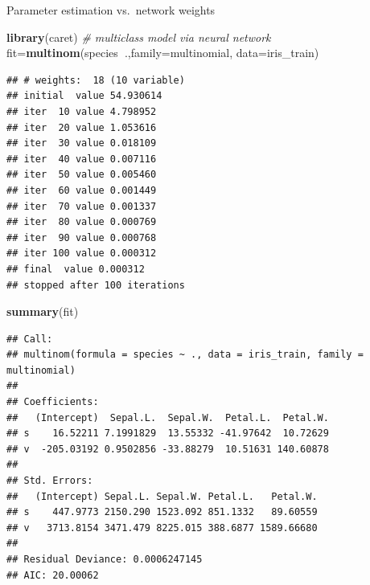 \documentclass[10pt,ignorenonframetext,]{beamer}
\newenvironment{Shaded}{\begin{snugshade}}{\end{snugshade}}
\newcommand{\KeywordTok}[1]{\textcolor[rgb]{0.13,0.29,0.53}{\textbf{#1}}}
\newcommand{\DataTypeTok}[1]{\textcolor[rgb]{0.13,0.29,0.53}{#1}}
\newcommand{\CommentTok}[1]{\textcolor[rgb]{0.56,0.35,0.01}{\textit{#1}}}
\newcommand{\OperatorTok}[1]{\textcolor[rgb]{0.81,0.36,0.00}{\textbf{#1}}}
\newcommand{\NormalTok}[1]{#1}
\begin{document}
\begin{frame}[fragile]

\begin{block}{Parameter estimation vs.~network weights}

\begin{Shaded}
\begin{Highlighting}[]
\KeywordTok{library}\NormalTok{(caret)}
\CommentTok{# multiclass model via neural network}
\NormalTok{fit=}\KeywordTok{multinom}\NormalTok{(species}\OperatorTok{~}\NormalTok{.,}\DataTypeTok{family=}\NormalTok{multinomial, }\DataTypeTok{data=}\NormalTok{iris_train)}
\end{Highlighting}
\end{Shaded}

\begin{verbatim}
## # weights:  18 (10 variable)
## initial  value 54.930614 
## iter  10 value 4.798952
## iter  20 value 1.053616
## iter  30 value 0.018109
## iter  40 value 0.007116
## iter  50 value 0.005460
## iter  60 value 0.001449
## iter  70 value 0.001337
## iter  80 value 0.000769
## iter  90 value 0.000768
## iter 100 value 0.000312
## final  value 0.000312 
## stopped after 100 iterations
\end{verbatim}

\begin{Shaded}
\begin{Highlighting}[]
\KeywordTok{summary}\NormalTok{(fit)}
\end{Highlighting}
\end{Shaded}

\begin{verbatim}
## Call:
## multinom(formula = species ~ ., data = iris_train, family = multinomial)
## 
## Coefficients:
##   (Intercept)  Sepal.L.  Sepal.W.  Petal.L.  Petal.W.
## s    16.52211 7.1991829  13.55332 -41.97642  10.72629
## v  -205.03192 0.9502856 -33.88279  10.51631 140.60878
## 
## Std. Errors:
##   (Intercept) Sepal.L. Sepal.W. Petal.L.   Petal.W.
## s    447.9773 2150.290 1523.092 851.1332   89.60559
## v   3713.8154 3471.479 8225.015 388.6877 1589.66680
## 
## Residual Deviance: 0.0006247145 
## AIC: 20.00062
\end{verbatim}

\begin{Shaded}
\end{Shaded}


\end{block}
\end{frame}
\end{document}
